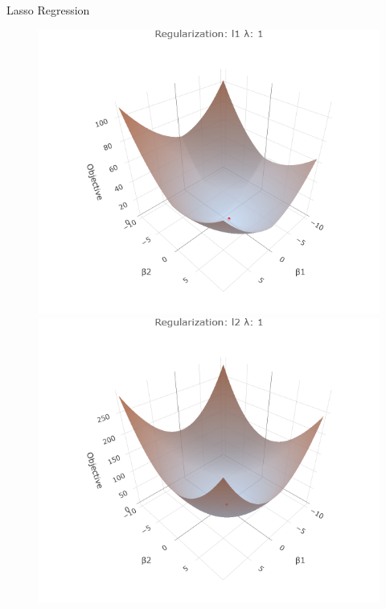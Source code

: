 \documentclass[11pt,compress,t,notes=noshow, xcolor=table]{beamer}
\begin{document}
\begin{vbframe}{Lasso Regression}
\begin{figure}
\begin{minipage}{0.32\linewidth}
    \end{minipage}
   \begin{minipage}{0.32\linewidth}
        \centerline{\includegraphics[width=\textwidth]{figure/reg_surfaces_l1_lam1.png}}
        \centerline{\includegraphics[width=\textwidth]{figure/reg_surfaces_l2_lam1.png}}
    \end{minipage}
    \begin{minipage}{0.32\linewidth}

\end{minipage}
\end{figure}
\end{vbframe}
\end{document}
